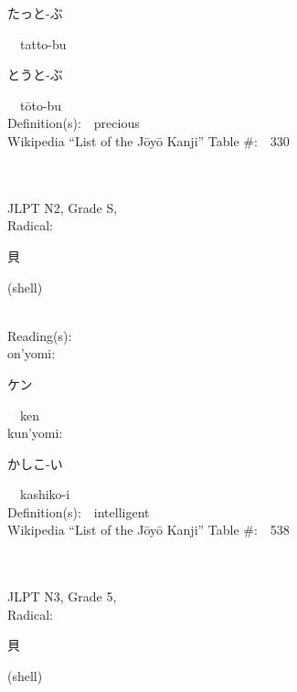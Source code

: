 \begin{multicols}{2}
{\hspace*{2em}}{\begin{CJK}{UTF8}{min} たっと-ぶ \end{CJK}}\ \ tatto-bu\ \ \\
{\hspace*{2em}}{\begin{CJK}{UTF8}{min} とうと-ぶ \end{CJK}}\ \ t\=oto-bu\ \ \\
Definition(s):\ \ precious \\
Wikipedia ``List of the J\=oy\=o Kanji'' Table \#:\ \ 330 \\
\ \ \\
{\fontsize{34pt}{40pt}  }\ \ \\  %
{JLPT N2, Grade S, \\Radical:\ \ {\begin{CJK}{UTF8}{min} 貝 \end{CJK}} (shell) } \\
Reading(s):\ \ \\
{\hspace*{1em}}on'yomi:\ \ \\
{\hspace*{2em}}{\begin{CJK}{UTF8}{min} ケン \end{CJK}}\ \ ken\ \ \\
{\hspace*{1em}}kun'yomi:\ \ \\
{\hspace*{2em}}{\begin{CJK}{UTF8}{min} かしこ-い \end{CJK}}\ \ kashiko-i\ \ \\
Definition(s):\ \ intelligent \\
Wikipedia ``List of the J\=oy\=o Kanji'' Table \#:\ \ 538 \\
\ \ \\
{\fontsize{34pt}{40pt}  }\ \ \\  %
{JLPT N3, Grade 5, \\Radical:\ \ {\begin{CJK}{UTF8}{min} 貝 \end{CJK}} (shell) } \\

\end{multicols}
